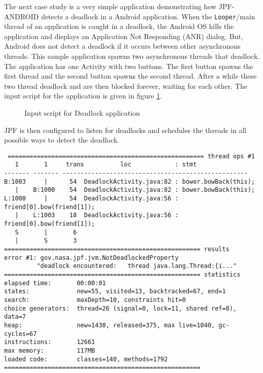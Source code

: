 \documentclass{acm_proc_article-sp}
\begin{document}
The next case study is a very simple application demonstrating how JPF-ANDROID detects a deadlock in a Android application. When the
\texttt{Looper}/main thread of an application is caught in a deadlock, the Android OS kills the application and displays an
Application Not Responding (ANR) dialog. But, Android does not detect a deadlock if it occurs between other asynchronous threads. This
sample application spawns two asynchronous threads that deadlock. The application has one Activity with two
buttons. The first button spawns the first thread and the second button spawns the second thread. After a while these two thread deadlock
and are then blocked forever, waiting for each other. The input script for the application is given in figure \ref{fig:deadlock}.
\begin{figure}
\vspace{-15pt}
\caption{Input script for Deadlock application}
\label{fig:deadlock}
\end{figure}

JPF is then configured to listen for deadlocks and schedules the threads in all possible ways to detect the deadlock.
\begingroup
 \fontsize{6pt}{7pt}\selectfont
\begin{verbatim}
 ====================================================== thread ops #1
   1       1     trans          loc            : stmt
------- ------- ---------------------------------------------------
B:1003     |      54  DeadlockActivity.java:82 : bower.bowBack(this);
   |    B:1000    54  DeadlockActivity.java:82 : bower.bowBack(this);
L:1000     |      54  DeadlockActivity.java:56 : friend[0].bow(friend[1]);
   |    L:1003    18  DeadlockActivity.java:56 : friend[0].bow(friend[1]);
   S       |       6
   |       S       3
====================================================== results
error #1: gov.nasa.jpf.jvm.NotDeadlockedProperty 
         "deadlock encountered:   thread java.lang.Thread:{i..."
====================================================== statistics
elapsed time:       00:00:01
states:             new=55, visited=13, backtracked=67, end=1
search:             maxDepth=10, constraints hit=0
choice generators:  thread=26 (signal=0, lock=11, shared ref=0), data=7
heap:               new=1430, released=375, max live=1040, gc-cycles=67
instructions:       12661
max memory:         117MB
loaded code:        classes=140, methods=1792
======================================================
\end{verbatim}
\endgroup
\end{document}
